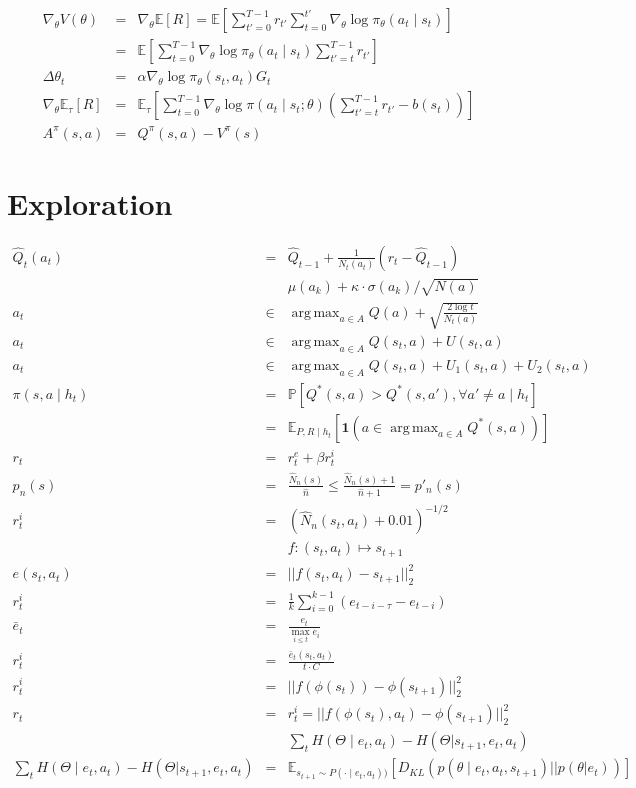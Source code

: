 \documentclass[]{article}
\DeclareMathOperator*{\argmax}{arg\,max}
\begin{document}
\begin{eqnarray}
    \nabla_\theta V(\theta) &=& \nabla_\theta \mathbb{E}[R] = \mathbb{E} \left[ \sum_{t'=0}^{T-1} r_{t'} \sum^{t'}_{t=0} \nabla_\theta \log \pi_\theta (a_t \mid s_t)  \right]\\
    &=& \mathbb{E} \left[ \sum_{t=0}^{T-1}  \nabla_\theta \log \pi_\theta (a_t \mid s_t)   \sum^{T-1}_{t'=t} r_{t'}  \right]\\
    \Delta \theta_t &=& \alpha \nabla_\theta \log \pi_\theta (s_t, a_t) G_t\\
    \nabla_\theta \mathbb{E}_\tau [R] &=& \mathbb{E}_\tau \left[ \sum_{t=0}^{T-1} \nabla_\theta \log \pi(a_t \mid s_t; \theta) \left( \sum_{t'=t}^{T-1} r_{t'} - b(s_t) \right) \right]\\
    A^\pi(s,a) &=& Q^\pi(s,a) - V^\pi(s) 
\end{eqnarray}

\section{Exploration}

\begin{eqnarray}
    \hat{Q}_t(a_t) &=& \hat{Q}_{t-1} + \frac{1}{N_t(a_t)} (r_t - \hat{Q}_{t-1})\\
    &&\mu(a_k) + \kappa \cdot \sigma(a_k) / \sqrt{N(a)}\\
    a_t &\in& \argmax_{a \in A} Q(a) + \sqrt{\frac{2\log t }{N_t(a)}}\\
    a_t &\in& \argmax_{a \in A} Q(s_t, a) + U(s_t, a) \\
    a_t &\in& \argmax_{a \in A} Q(s_t, a) + U_1(s_t, a) + U_2(s_t, a)\\
    \pi(s, a \mid h_t) &=& \mathbb{P} [Q^*(s,a) > Q^*(s,a'), \forall a' \neq a \mid h_t] \\
    &=& \mathbb{E}_{P, R \mid h_t} \left[\mathbf{1}(a \in \argmax_{a \in A} Q^*(s,a))\right]\\
    r_t &=& r^e_t + \beta r_t^i\\
    p_n(s) &=&  \frac{\hat{N}_n(s)}{\hat{n}} \leq \frac{\hat{N}_n(s) + 1}{\hat{n} + 1} = p'_n(s)\\
    r_t^i &=& (\hat{N}_n (s_t, a_t) + 0.01)^{-1/2} \\
    && f: (s_t, a_t) \mapsto s_{t+1} \\
    e(s_t, a_t) &=& || f(s_t, a_t) - s_{t+1}||_2^2\\
    r_t^i &=& \frac{1}{k} \sum_{i=0}^{k-1} (e_{t-i-\tau} - e_{t-i})\\
    \bar{e}_t &=& \frac{e_t}{\max_{i \leq t} e_i} \\
    r_t^i &=& \frac{\bar{e}_t(s_t, a_t)}{t \cdot C}\\
    r_t^i &=& || f(\phi(s_{t})) - \phi(s_{t+1})||^2_2\\
    r_t  &=& r_t^i = ||f(\phi(s_t), a_t) - \phi(s_{t+1}) ||_2^2\\
    &&\sum_t H(\Theta \mid e_t, a_t) - H(\Theta | s_{t+1}, e_t, a_t)\\
    \sum_t H(\Theta \mid e_t, a_t) - H(\Theta | s_{t+1}, e_t, a_t) &=& \mathbb{E}_{s_{t+1}\sim P(\cdot\mid e_t, a_t))} \left[ D_{KL} (p(\theta \mid e_t, a_t, s_{t+1}) || p(\theta|e_t))  \right]
\end{eqnarray}
\end{document}
